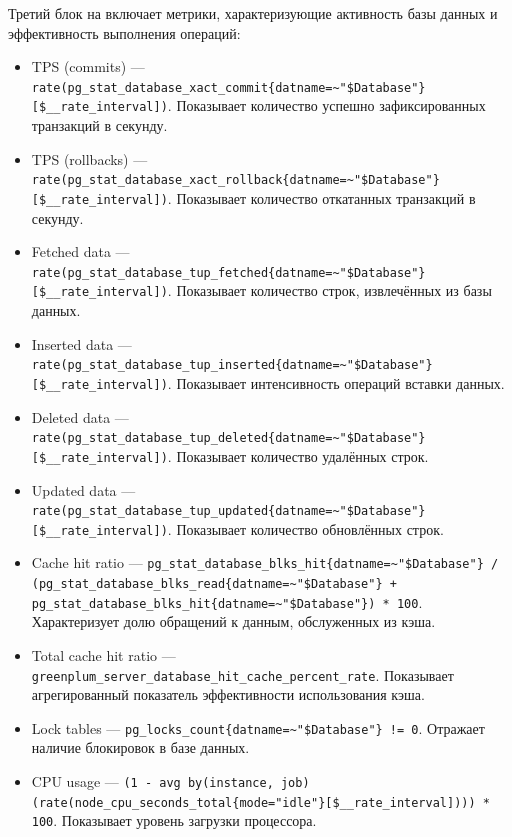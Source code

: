 Третий блок на  включает метрики, характеризующие активность базы данных и эффективность выполнения операций:

\begin{itemize}
	\item TPS (commits) — \lstinline|rate(pg_stat_database_xact_commit{datname=~"$Database"}[$__rate_interval])|. Показывает количество успешно зафиксированных транзакций в секунду.
	
	\item TPS (rollbacks) — \lstinline|rate(pg_stat_database_xact_rollback{datname=~"$Database"}[$__rate_interval])|. Показывает количество откатанных транзакций в секунду.
	
	\item Fetched data — \lstinline|rate(pg_stat_database_tup_fetched{datname=~"$Database"}[$__rate_interval])|. Показывает количество строк, извлечённых из базы данных.
	
	\item Inserted data — \lstinline|rate(pg_stat_database_tup_inserted{datname=~"$Database"}[$__rate_interval])|. Показывает интенсивность операций вставки данных.
	
	\item Deleted data — \lstinline|rate(pg_stat_database_tup_deleted{datname=~"$Database"}[$__rate_interval])|. Показывает количество удалённых строк.
	
	\item Updated data — \lstinline|rate(pg_stat_database_tup_updated{datname=~"$Database"}[$__rate_interval])|. Показывает количество обновлённых строк.
	
	\item Cache hit ratio — \lstinline|pg_stat_database_blks_hit{datname=~"$Database"} / (pg_stat_database_blks_read{datname=~"$Database"} +|  \\ \lstinline|pg_stat_database_blks_hit{datname=~"$Database"}) * 100|. Характеризует долю обращений к данным, обслуженных из кэша.
	
	\item Total cache hit ratio — \lstinline|greenplum_server_database_hit_cache_percent_rate|. Показывает агрегированный показатель эффективности использования кэша.
	
	\item Lock tables — \lstinline|pg_locks_count{datname=~"$Database"} != 0|. Отражает наличие блокировок в базе данных.
	
	\item CPU usage — \lstinline|(1 - avg by(instance, job)(rate(node_cpu_seconds_total{mode="idle"}[$__rate_interval]))) * 100|. Показывает уровень загрузки процессора.
	

\end{itemize}
